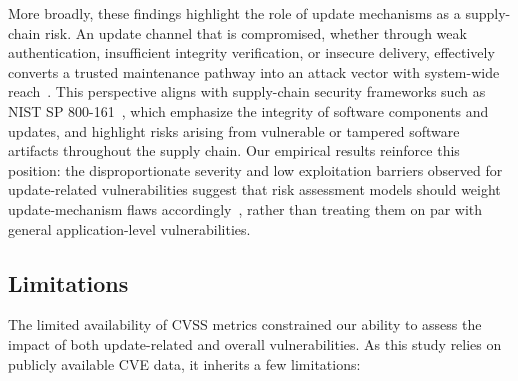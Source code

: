 \documentclass[fleqn,s1,names,tex]{neptune}
\begin{document}
More broadly, these findings highlight the role of update mechanisms as a supply-chain risk. 
An update channel that is compromised, whether through weak authentication,
insufficient integrity verification, or insecure delivery, effectively converts
a trusted maintenance pathway into an attack vector with system-wide
reach~\citep{268927}. 
This perspective aligns with supply-chain security frameworks such as NIST SP
800-161~\citep{NIST-SP800-161r1}, which emphasize the integrity of software
components and updates, and highlight risks arising from vulnerable or tampered
software artifacts throughout the supply chain.
Our empirical results reinforce this position: the disproportionate severity
and low exploitation barriers observed for update-related vulnerabilities
suggest that risk assessment models should weight update-mechanism flaws
accordingly~\citep{9780011,10.1007/978-3-032-02504-3_29}, rather than treating
them on par with general application-level vulnerabilities.


\subsection{Limitations}
The limited availability of CVSS metrics constrained our ability to assess the impact of both update-related and overall vulnerabilities. As this study relies on publicly available CVE data, it inherits a few limitations:
\end{document}
